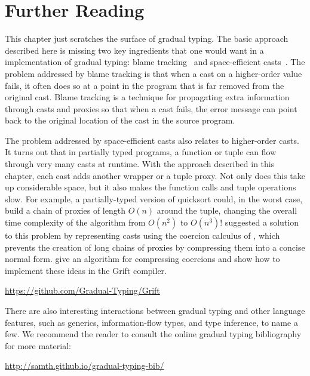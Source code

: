 \documentclass[7x10]{TimesAPriori_MIT}%
\numberwithin{theorem}{chapter}
\numberwithin{definition}{chapter}
\numberwithin{equation}{chapter}
\begin{document}
\section{Further Reading}

This chapter just scratches the surface of gradual typing.  The basic
approach described here is missing two key ingredients that one would
want in a implementation of gradual typing: blame
tracking~\citep{Tobin-Hochstadt:2006fk,Wadler:2009qv} and
space-efficient casts~\citep{Herman:2006uq,Herman:2010aa}.  The
problem addressed by blame tracking is that when a cast on a
higher-order value fails, it often does so at a point in the program
that is far removed from the original cast. Blame tracking is a
technique for propagating extra information through casts and proxies
so that when a cast fails, the error message can point back to the
original location of the cast in the source program.

The problem addressed by space-efficient casts also relates to
higher-order casts. It turns out that in partially typed programs, a
function or tuple can flow through very many casts at runtime. With
the approach described in this chapter, each cast adds another
 wrapper or a tuple proxy. Not only does this take up
considerable space, but it also makes the function calls and tuple
operations slow.  For example, a partially-typed version of quicksort
could, in the worst case, build a chain of proxies of length $O(n)$
around the tuple, changing the overall time complexity of the
algorithm from $O(n^2)$ to $O(n^3)$! \citet{Herman:2006uq} suggested a
solution to this problem by representing casts using the coercion
calculus of \citet{Henglein:1994nz}, which prevents the creation of
long chains of proxies by compressing them into a concise normal
form. \citet{Siek:2015ab} give an algorithm for compressing coercions
and \citet{Kuhlenschmidt:2019aa} show how to implement these ideas in
the Grift compiler.
\begin{center}
  \url{https://github.com/Gradual-Typing/Grift}
\end{center}

There are also interesting interactions between gradual typing and
other language features, such as generics, information-flow types, and
type inference, to name a few. We recommend the reader to consult the
online gradual typing bibliography for more material:
\begin{center}
  \url{http://samth.github.io/gradual-typing-bib/}
\end{center}
\end{document}
